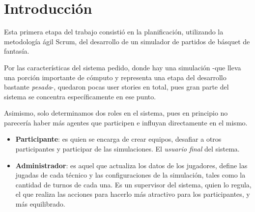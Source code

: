 \section{Introducción}
\indent \indent Esta primera etapa del trabajo consistió en la planificación, utilizando la metodología ágil Scrum, del desarrollo de un simulador de partidos de básquet de fantasía.

Por las características del sistema pedido, donde hay una simulación -que lleva una porción importante de cómputo y representa una etapa del desarrollo bastante \emph{pesada}-, quedaron pocas user stories en total, pues gran parte del sistema se concentra específicamente en ese punto.

Asimismo, solo determinamos dos roles en el sistema, pues en principio no parecería haber más agentes que participen e influyan directamente en el mismo. 

\begin{itemize}
\item \textbf{Participante}: es quien se encarga de crear equipos, desafiar a otros participantes y participar de las simulaciones. El \textit{usuario final} del sistema.
\item \textbf{Administrador}: es aquel que actualiza los datos de los jugadores, define las jugadas de cada técnico y las configuraciones de la simulación, tales como la cantidad de turnos de cada una. Es un supervisor del sistema, quien lo regula, el que realiza las acciones para hacerlo más atractivo para los participantes, y más equilibrado.
\end{itemize}
